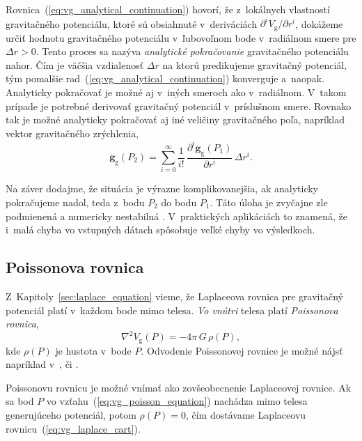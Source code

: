 \documentclass[a4paper, 12pt]{book}
\newcommand{\gidx}{\mathrm g}
\let\vec\mathbf
\begin{document}
Rovnica~(\ref{eq:vg_analytical_continuation}) hovorí, že z~lokálnych vlastností
gravitačného potenciálu, ktoré sú obsiahnuté v~deriváciách $\partial^i V_\gidx
\slash \partial r^i$, dokážeme určiť hodnotu gravitačného potenciálu
v~ľubovoľnom bode v~radiálnom smere pre $\Delta r > 0$.  Tento proces sa nazýva
\emph{analytické pokračovanie} gravitačného potenciálu nahor.  Čím je väčšia
vzdialenosť $\Delta r$ na ktorú predikujeme gravitačný potenciál, tým pomalšie
rad~(\ref{eq:vg_analytical_continuation}) konverguje a~naopak.  Analyticky
pokračovať je možné aj v~iných smeroch ako v~radiálnom.  V~takom prípade je
potrebné derivovať gravitačný potenciál v~príslušnom smere.  Rovnako tak je
možné analyticky pokračovať aj iné veličiny gravitačného poľa, napríklad vektor
gravitačného zrýchlenia,
%
\begin{equation}
\vec g_\gidx(P_2) = \sum_{i = 0}^{\infty} \frac{1}{i!} \, \frac{\partial^i \vec
g_\gidx(P_1)}{\partial r^i} \, \Delta r^i{.}
\end{equation}

Na záver dodajme, že situácia je výrazne komplikovanejšia, ak analyticky 
pokračujeme nadol, teda z~bodu $P_2$ do bodu $P_1$.  Táto úloha je zvyčajne zle 
podmienená a numericky nestabilná \citep{SansoGeodeticBoundaryValueProblem}.  
V~praktických aplikáciách to znamená, že i~malá chyba vo vstupných dátach 
spôsobuje veľké chyby vo výsledkoch.






\subsection{Poissonova rovnica}
\label{sec:poisson_equation}

Z~Kapitoly~\ref{sec:laplace_equation} vieme, že Laplaceova rovnica pre
gravitačný potenciál platí v~každom bode mimo telesa.  \emph{Vo vnútri} telesa
platí \emph{Poissonova rovnica},
%
\begin{equation}
\label{eq:vg_poisson_equation}
\nabla^2 V_\gidx(P) = -4 \pi \, G \, \rho(P){,}
\end{equation}
%
kde $\rho(P)$ je hustota v~bode $P$.  Odvodenie Poissonovej rovnice je možné
nájsť napríklad v~\cite{MacMillan1930}, \cite{Kellogg1967} či
\cite{SansoGeoidDetermination}.

Poissonovu rovnicu je možné vnímať ako zovšeobecnenie Laplaceovej rovnice.  Ak
sa bod $P$ vo vzťahu~(\ref{eq:vg_poisson_equation}) nachádza mimo telesa
generujúceho potenciál, potom $\rho(P) = 0$, čím dostávame Laplaceovu
rovnicu~(\ref{eq:vg_laplace_cart}).
\end{document}

